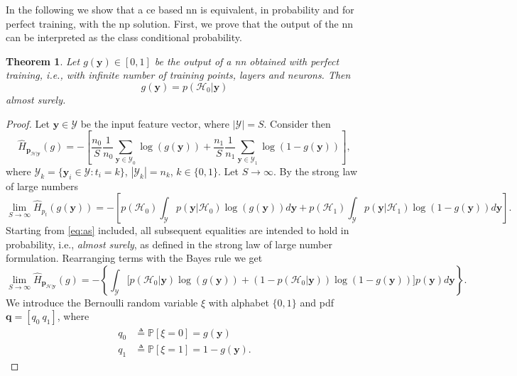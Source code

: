 \documentclass[conference,draftcls,onecolumn]{IEEEtran}
\newcommand{\hatcross}[2]{\hat{H}_{#1}(#2)}
\newcommand{\gy}{g(\bm y)}
\newcommand{\pr}[1]{\mathbb{P} \left[ #1 \right]}
\newtheorem{theorem}{Theorem}
\begin{document}
In the following we show that a \ac{ce} based \ac{nn} is equivalent, in probability and for perfect training, with the \ac{np} solution. First, we prove that the output of the \ac{nn} can be interpreted as the class conditional probability. 
\begin{theorem}
Let $\gy \in [0,1]$ be the output of a \ac{nn} obtained with perfect training, i.e., with infinite number of training points, layers and neurons. Then
\begin{equation}
	\gy = p(\mathcal{H}_0|\bm y)	
\end{equation}
almost surely.
\end{theorem}
\begin{proof}
Let $\bm y \in \mathcal{Y}$ be the input feature vector, where $|\mathcal{Y}|=S$. Consider then 
\begin{equation}
	\hatcross{\bm p_{\mathcal{H}|\bm y}}{g} = - \left[ \frac{n_0}{S} \frac{1}{n_0} \sum_{\bm y \in \mathcal{Y}_0} \log(\gy) 
		+ \frac{n_1}{S} \frac{1}{n_1} \sum_{\bm y \in \mathcal{Y}_1} \log(1-\gy) \right],	
\end{equation}
where $\mathcal{Y}_k = \{\bm y_i \in \mathcal{Y} : t_i = k\}$, $|\mathcal{Y}_k|=n_k$, $k \in \{0,1\}$.
Let $S \to \infty$. By the strong law of large numbers \cite{etemadi1981elementary}
\begin{equation}
\label{eq:as}
	\lim_{S \to \infty}	\hatcross{p_t}{\gy} = - \left[ p(\mathcal{H}_0) \int_{\mathcal{Y}} p(\bm y|\mathcal{H}_0) \log (\gy) d\bm y + 
		 p(\mathcal{H}_1) \int_{\mathcal{Y}} p(\bm y|\mathcal{H}_1) \log (1-\gy) d\bm y \right].
\end{equation}
Starting from \eqref{eq:as} included, all subsequent equalities are intended to hold in probability, i.e., \textit{almost surely}, as defined in the strong law of large number formulation.
Rearranging terms with the Bayes rule we get
\begin{equation}
\label{eq:dim1}
\lim_{S \to \infty}	\hatcross{\bm p_{\mathcal{H}|\bm y}}{g} = - \left\{ \int_{\mathcal{Y}} \bigl[ p(\mathcal{H}_0|\bm y) \log(\gy) + 
	(1-p(\mathcal{H}_0|\bm y)) \log(1-\gy)\bigr] p(\bm y)   d\bm y \right\}. 		
\end{equation}
We introduce the Bernoulli random variable $\xi$ with alphabet $ \{0,1\}$ and \ac{pdf} $\bm q = [q_0 \ q_1]$, where
\begin{subequations}
\label{eq:q}
\begin{align}
	q_0 &\triangleq \pr{\xi=0}=\gy \\
	q_1 &\triangleq \pr{\xi=1}=1-\gy.
\end{align}

\end{subequations}
\end{proof}
\end{document}

